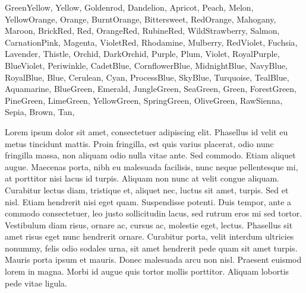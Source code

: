 {\color{GreenYellow}GreenYellow}, {\color{Yellow}Yellow}, {\color{Goldenrod}Goldenrod}, {\color{Dandelion}Dandelion}, {\color{Apricot}Apricot}, {\color{Peach}Peach}, {\color{Melon}Melon}, {\color{YellowOrange}YellowOrange}, {\color{Orange}Orange}, {\color{BurntOrange}BurntOrange}, {\color{Bittersweet}Bittersweet}, {\color{RedOrange}RedOrange}, {\color{Mahogany}Mahogany}, {\color{Maroon}Maroon}, {\color{BrickRed}BrickRed}, {\color{Red}Red}, {\color{OrangeRed}OrangeRed}, {\color{RubineRed}RubineRed}, {\color{WildStrawberry}WildStrawberry}, {\color{Salmon}Salmon}, {\color{CarnationPink}CarnationPink}, {\color{Magenta}Magenta}, {\color{VioletRed}VioletRed}, {\color{Rhodamine}Rhodamine}, {\color{Mulberry}Mulberry}, {\color{RedViolet}RedViolet}, {\color{Fuchsia}Fuchsia}, {\color{Lavender}Lavender}, {\color{Thistle}Thistle}, {\color{Orchid}Orchid}, {\color{DarkOrchid}DarkOrchid}, {\color{Purple}Purple}, {\color{Plum}Plum}, {\color{Violet}Violet}, {\color{RoyalPurple}RoyalPurple}, {\color{BlueViolet}BlueViolet}, {\color{Periwinkle}Periwinkle}, {\color{CadetBlue}CadetBlue}, {\color{CornflowerBlue}CornflowerBlue}, {\color{MidnightBlue}MidnightBlue}, {\color{NavyBlue}NavyBlue}, {\color{RoyalBlue}RoyalBlue}, {\color{Blue}Blue}, {\color{Cerulean}Cerulean}, {\color{Cyan}Cyan}, {\color{ProcessBlue}ProcessBlue}, {\color{SkyBlue}SkyBlue}, {\color{Turquoise}Turquoise}, {\color{TealBlue}TealBlue}, {\color{Aquamarine}Aquamarine}, {\color{BlueGreen}BlueGreen}, {\color{Emerald}Emerald}, {\color{JungleGreen}JungleGreen}, {\color{SeaGreen}SeaGreen}, {\color{Green}Green}, {\color{ForestGreen}ForestGreen}, {\color{PineGreen}PineGreen}, {\color{LimeGreen}LimeGreen}, {\color{YellowGreen}YellowGreen}, {\color{SpringGreen}SpringGreen}, {\color{OliveGreen}OliveGreen}, {\color{RawSienna}RawSienna}, {\color{Sepia}Sepia}, {\color{Brown}Brown}, {\color{Tan}Tan}, {\color{Gray}



Lorem ipsum dolor sit amet, consectetuer adipiscing elit. Phasellus id velit eu metus tincidunt mattis. Proin fringilla, est quis varius placerat, odio nunc fringilla massa, non aliquam odio nulla vitae ante. Sed commodo. Etiam aliquet augue. Maecenas porta, nibh eu malesuada facilisis, nunc neque pellentesque mi, at porttitor nisi lacus id turpis. Aliquam non nunc at velit congue aliquam. Curabitur lectus diam, tristique et, aliquet nec, luctus sit amet, turpis. Sed et nisl. Etiam hendrerit nisi eget quam. Suspendisse potenti. Duis tempor, ante a commodo consectetuer, leo justo sollicitudin lacus, sed rutrum eros mi sed tortor. Vestibulum diam risus, ornare ac, cursus ac, molestie eget, lectus. Phasellus sit amet risus eget nunc hendrerit ornare. Curabitur porta, velit interdum ultricies nonummy, felis odio sodales urna, sit amet hendrerit pede quam sit amet turpis. Mauris porta ipsum et mauris. Donec malesuada arcu non nisl. Praesent euismod lorem in magna. Morbi id augue quis tortor mollis porttitor. Aliquam lobortis pede vitae ligula. 

}
